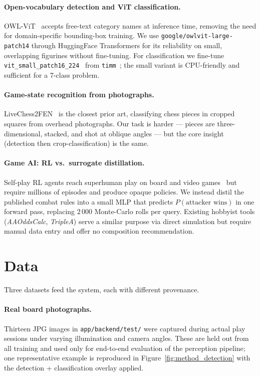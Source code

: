 \documentclass[10pt,twocolumn,letterpaper]{article}
\begin{document}
\paragraph{Open-vocabulary detection and ViT classification.}
OWL-ViT~\cite{owlvit} accepts free-text category names at inference
time, removing the need for domain-specific bounding-box training.
We use \texttt{google/owlvit-large-patch14} through HuggingFace
Transformers for its reliability on small, overlapping figurines
without fine-tuning. For classification we fine-tune
\texttt{vit\_small\_patch16\_224}~\cite{vit} from \texttt{timm}~\cite{timm};
the small variant is CPU-friendly and sufficient for a 7-class
problem.

\paragraph{Game-state recognition from photographs.}
LiveChess2FEN~\cite{livechess2fen} is the closest prior art,
classifying chess pieces in cropped squares from overhead
photographs. Our task is harder --- pieces are three-dimensional,
stacked, and shot at oblique angles --- but the core insight
(detection then crop-classification) is the same.

\paragraph{Game AI: RL vs.\ surrogate distillation.}
Self-play RL agents reach superhuman play on board and video
games~\cite{alphazero} but require millions of
episodes and produce opaque policies. We instead distil the
published combat rules into a small MLP that predicts
$P(\text{attacker wins})$ in one forward pass, replacing
$2\,000$ Monte-Carlo rolls per query. Existing hobbyist tools
(\emph{AAOddsCalc}, \emph{TripleA}) serve a similar purpose via
direct simulation but require manual data entry and offer no
composition recommendation.

\section{Data}
\label{sec:data}

Three datasets feed the system, each with different provenance.

\paragraph{Real board photographs.}
Thirteen JPG images in \texttt{app/backend/test/} were captured
during actual play sessions under varying illumination and camera
angles. These are held out from all training and used
only for end-to-end evaluation of the perception pipeline; one
representative example is reproduced in
Figure~\ref{fig:method_detection} with the detection + classification
overlay applied.
\end{document}
